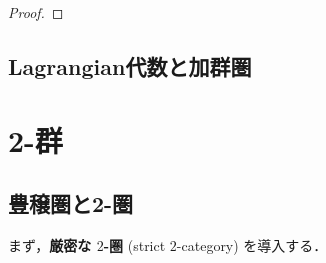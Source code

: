\documentclass[TQFT_main]{subfiles}
\begin{document}
\begin{proof}
    
\end{proof}

\subsection{Lagrangian代数と加群圏}

 

\section{2-群}

\subsection{豊穣圏と2-圏}

まず，\textbf{厳密な $2$-圏} (strict $2$-category) を導入する．
\end{document}
